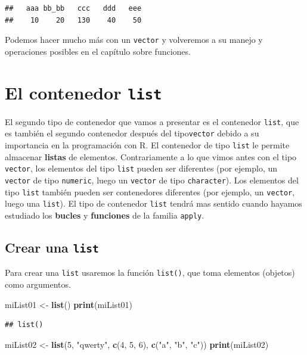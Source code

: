 \documentclass[]{book}
\newenvironment{Shaded}{\begin{snugshade}}{\end{snugshade}}
\newcommand{\KeywordTok}[1]{\textcolor[rgb]{0.13,0.29,0.53}{\textbf{#1}}}
\newcommand{\DecValTok}[1]{\textcolor[rgb]{0.00,0.00,0.81}{#1}}
\newcommand{\StringTok}[1]{\textcolor[rgb]{0.31,0.60,0.02}{#1}}
\newcommand{\NormalTok}[1]{#1}
\begin{document}
\begin{verbatim}
##   aaa bb_bb   ccc   ddd   eee 
##    10    20   130    40    50
\end{verbatim}

Podemos hacer mucho más con un \texttt{vector} y volveremos a su manejo
y operaciones posibles en el capítulo sobre funciones.

\hypertarget{l014list}{\section{\texorpdfstring{El contenedor
\texttt{list}}{El contenedor list}}\label{l014list}}

El segundo tipo de contenedor que vamos a presentar es el contenedor
\texttt{list}, que es también el segundo contenedor después del
tipo\texttt{vector} debido a su importancia en la programación con R. El
contenedor de tipo \texttt{list} le permite almacenar \textbf{listas} de
elementos. Contrariamente a lo que vimos antes con el tipo
\texttt{vector}, los elementos del tipo \texttt{list} pueden ser
diferentes (por ejemplo, un \texttt{vector} de tipo \texttt{numeric},
luego un \texttt{vector} de tipo \texttt{character}). Los elementos del
tipo \texttt{list} también pueden ser contenedores diferentes (por
ejemplo, un \texttt{vector}, luego una \texttt{list}). El tipo de
contenedor \texttt{list} tendrá mas sentido cuando hayamos estudiado los
\textbf{bucles} y \textbf{funciones} de la familia \texttt{apply}.

\subsection{\texorpdfstring{Crear una
\texttt{list}}{Crear una list}}\label{crear-una-list}

Para crear una \texttt{list} usaremos la función \texttt{list()}, que
toma elementos (objetos) como argumentos.

\begin{Shaded}
\begin{Highlighting}[]
\NormalTok{miList01 <-}\StringTok{ }\KeywordTok{list}\NormalTok{()}
\KeywordTok{print}\NormalTok{(miList01)}
\end{Highlighting}
\end{Shaded}

\begin{verbatim}
## list()
\end{verbatim}

\begin{Shaded}
\begin{Highlighting}[]
\NormalTok{miList02 <-}\StringTok{ }\KeywordTok{list}\NormalTok{(}\DecValTok{5}\NormalTok{, }\StringTok{"qwerty"}\NormalTok{, }\KeywordTok{c}\NormalTok{(}\DecValTok{4}\NormalTok{, }\DecValTok{5}\NormalTok{, }\DecValTok{6}\NormalTok{), }\KeywordTok{c}\NormalTok{(}\StringTok{"a"}\NormalTok{, }\StringTok{"b"}\NormalTok{, }\StringTok{"c"}\NormalTok{))}
\KeywordTok{print}\NormalTok{(miList02)}
\end{Highlighting}
\end{Shaded}
\end{document}
